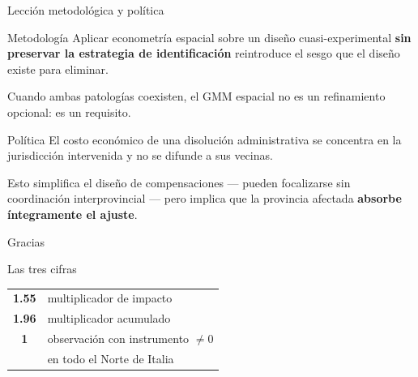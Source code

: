 \documentclass[
  10pt,
  ignorenonframetext,
  aspectratio=169,
  spanish,
]{beamer}
\begin{document}
\begin{frame}{Lección metodológica y política}
\protect{}\label{lecciuxf3n-metodoluxf3gica-y-poluxedtica}
\begin{block}{Metodología}
Aplicar econometría espacial sobre un diseño cuasi-experimental \textbf{sin preservar la estrategia de identificación} reintroduce el sesgo que el diseño existe para eliminar.

\vspace{0.15cm}

Cuando ambas patologías coexisten, el GMM espacial no es un refinamiento opcional: es un requisito.
\end{block}

\vspace{0.3cm}

\begin{block}{Política}
El costo económico de una disolución administrativa se concentra en la jurisdicción intervenida y no se difunde a sus vecinas.

\vspace{0.15cm}

Esto simplifica el diseño de compensaciones --- pueden focalizarse sin coordinación interprovincial --- pero implica que la provincia afectada \textbf{absorbe íntegramente el ajuste}.
\end{block}
\end{frame}

\begin{frame}{\phantom{Gracias}}
\protect{}\label{section}
\begin{center}
\vspace{1cm}
{\Huge Gracias}

\vspace{1.2cm}

{\large Las tres cifras}

\vspace{0.5cm}

\begin{tabular}{cl}
\textbf{1.55} & multiplicador de impacto \\[0.3cm]
\textbf{1.96} & multiplicador acumulado \\[0.3cm]
\textbf{1} & observación con instrumento $\neq 0$ \\
 & en todo el Norte de Italia \\
\end{tabular}
\end{center}
\end{frame}
\end{document}
